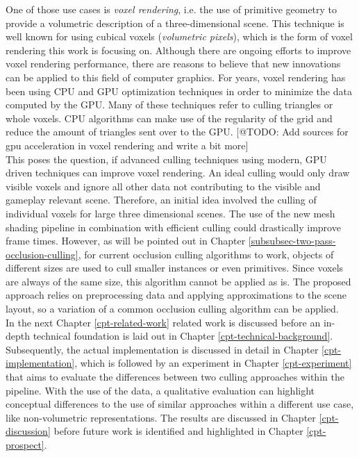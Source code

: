 \noindent
One of those use cases is \emph{voxel rendering}, i.e. the use of primitive geometry to provide a 
volumetric description of a three-dimensional scene. This technique is well known for using 
cubical voxels (\emph{volumetric pixels}), which is the form of voxel rendering this work is 
focusing on. Although there are ongoing efforts to improve voxel rendering performance, there are 
reasons to believe that new innovations can be applied to this field of computer graphics. For years, 
voxel rendering has been using \ac{CPU} and \ac{GPU} optimization techniques in order to minimize 
the data computed by the \ac{GPU}. Many of these techniques refer to culling triangles or whole voxels. 
\ac{CPU} algorithms can make use of the regularity of the grid and reduce the amount of triangles sent 
over to the \ac{GPU}. [@TODO: Add sources for gpu acceleration in voxel rendering and write a bit more] \\

\noindent
This poses the question, if advanced culling techniques using modern, \ac{GPU} driven techniques can 
improve voxel rendering. An ideal culling would only draw visible voxels and ignore all other data 
not contributing to the visible and gameplay relevant scene. Therefore, an initial idea involved 
the culling of individual voxels for large three dimensional scenes. The use of the new mesh shading 
pipeline in combination with efficient culling could drastically improve frame times. However, as will be 
pointed out in Chapter \ref{subsubsec-two-pass-occlusion-culling}, for current occlusion culling 
algorithms to work, objects of different sizes are used to cull smaller instances or even primitives.
Since voxels are always of the same size, this algorithm cannot be applied as is. The proposed approach 
relies on preprocessing data and applying approximations to the scene layout, so a variation of a 
common occlusion culling algorithm can be applied. \\

\noindent
In the next Chapter \ref{cpt-related-work} related work is discussed before an in-depth technical foundation 
is laid out in Chapter \ref{cpt-technical-background}. Subsequently, the actual implementation is discussed 
in detail in Chapter \ref{cpt-implementation}, which is followed by an experiment in Chapter \ref{cpt-experiment} 
that aims to evaluate the differences between two culling approaches within the pipeline. With the use of the data, 
a qualitative evaluation can highlight conceptual differences to the use of similar approaches within a different 
use case, like non-volumetric representations. The results are discussed in Chapter \ref{cpt-discussion} before 
future work is identified and highlighted in Chapter \ref{cpt-prospect}. 

